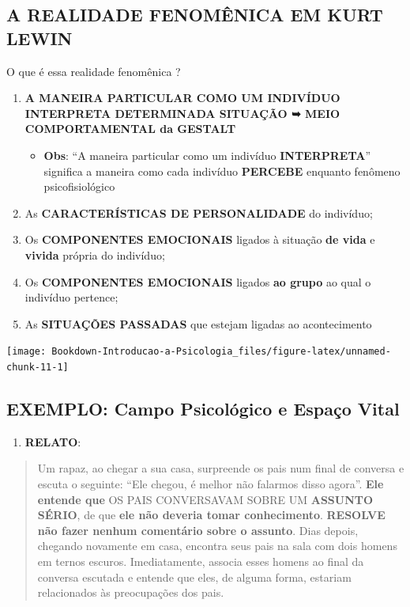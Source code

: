\documentclass[
]{book}
\providecommand{\tightlist}{%
  \setlength{\itemsep}{0pt}\setlength{\parskip}{0pt}}
\begin{document}
\hypertarget{a-realidade-fenomuxeanica-em-kurt-lewin}{%
\subsection{A REALIDADE FENOMÊNICA EM KURT LEWIN}\label{a-realidade-fenomuxeanica-em-kurt-lewin}}

O que é essa realidade fenomênica ?

\begin{enumerate}
\def\labelenumi{\arabic{enumi}.}
\tightlist
\item
  \textbf{A MANEIRA PARTICULAR COMO UM INDIVÍDUO INTERPRETA DETERMINADA SITUAÇÃO ➥ MEIO COMPORTAMENTAL da GESTALT}

  \begin{itemize}
  \tightlist
  \item
    \textbf{Obs}: ``A maneira particular como um indivíduo \textbf{INTERPRETA}'' significa a maneira como cada indivíduo \textbf{PERCEBE} enquanto fenômeno psicofisiológico
  \end{itemize}
\item
  As \textbf{CARACTERÍSTICAS DE PERSONALIDADE} do indivíduo;
\item
  Os \textbf{COMPONENTES EMOCIONAIS} ligados à situação \textbf{de vida} e \textbf{vivida} própria do indivíduo;
\item
  Os \textbf{COMPONENTES EMOCIONAIS} ligados \textbf{ao grupo} ao qual o indivíduo pertence;
\item
  As \textbf{SITUAÇÕES PASSADAS} que estejam ligadas ao acontecimento
\end{enumerate}

\texttt{[image: Bookdown-Introducao-a-Psicologia\_files/figure-latex/unnamed-chunk-11-1]}

\hypertarget{exemplo-campo-psicoluxf3gico-e-espauxe7o-vital}{%
\subsection{EXEMPLO: Campo Psicológico e Espaço Vital}\label{exemplo-campo-psicoluxf3gico-e-espauxe7o-vital}}

\begin{enumerate}
\def\labelenumi{\arabic{enumi}.}
\tightlist
\item
  \textbf{RELATO}:
\end{enumerate}

\begin{quote}
Um rapaz, ao chegar a sua casa, surpreende os pais num final de conversa e escuta o seguinte: ``Ele chegou, é melhor não falarmos disso agora''. \textbf{Ele entende que} OS PAIS CONVERSAVAM SOBRE UM \textbf{ASSUNTO SÉRIO}, de que \textbf{ele não deveria tomar conhecimento}. \textbf{RESOLVE não fazer nenhum comentário sobre o assunto}. Dias depois, chegando novamente em casa, encontra seus pais na sala com dois homens em ternos escuros. Imediatamente, associa esses homens ao final da conversa escutada e entende que eles, de alguma forma, estariam relacionados às preocupações dos pais.
\end{quote}
\end{document}
